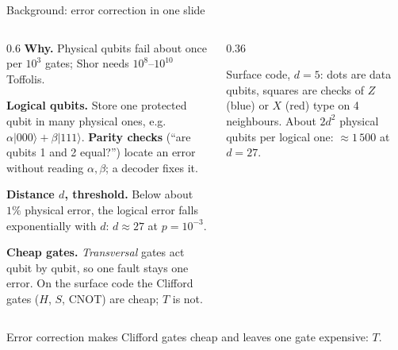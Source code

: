\documentclass[aspectratio=169,11pt]{beamer}
\begin{document}
{
\begin{frame}[noframenumbering]{Background: error correction in one slide}
  \begin{columns}[T,onlytextwidth]
    \begin{column}{0.6\textwidth}
      \small
      \textbf{Why.} Physical qubits fail about once per $10^3$ gates; Shor needs $10^8$--$10^{10}$ Toffolis.\par\vskip0.8mm
      \textbf{Logical qubits.} Store one protected qubit in many physical ones, e.g.\ $\alpha|000\rangle+\beta|111\rangle$. \textbf{Parity checks} (``are qubits 1 and 2 equal?'') locate an error without reading $\alpha,\beta$; a decoder fixes it.\par\vskip0.8mm
      \textbf{Distance $d$, threshold.} Below about $1\%$ physical error, the logical error falls exponentially with $d$: $d\approx27$ at $p=10^{-3}$.\par\vskip0.8mm
      \textbf{Cheap gates.} \emph{Transversal} gates act qubit by qubit, so one fault stays one error. On the surface code the Clifford gates ($H$, $S$, CNOT) are cheap; $T$ is not.
    \end{column}
    \begin{column}{0.36\textwidth}
      \centering
      \par
      \vskip1mm
      {\scriptsize Surface code, $d=5$: dots are data qubits, squares are checks of $Z$ (blue) or $X$ (red) type on 4 neighbours. About $2d^2$ physical qubits per logical one: ${\approx}1\,500$ at $d=27$.}
    \end{column}
  \end{columns}
  \begin{takeaway}Error correction makes Clifford gates cheap and leaves one gate expensive: $T$.\end{takeaway}
\end{frame}}
\end{document}
